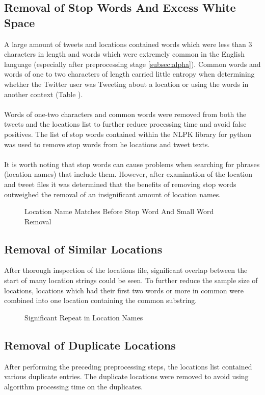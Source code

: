 \documentclass[11pt,a4paper]{article}
\begin{document}
\subsection{Removal of Stop Words And Excess White Space}
A large amount of tweets and locations contained words which were less than 3 characters in length and words which were extremely common in the English language (especially after preprocessing stage \ref{subsec:alpha}). Common words and words of one to two characters of length carried little entropy when determining whether the Twitter user was Tweeting about a location or using the words in another context (Table ).\\\\
Words of one-two characters and common words were removed from both the tweets and the locations list to further reduce processing time and avoid false positives. The list of stop words contained within the NLPK library for python was used to remove stop words from he locations and tweet texts.\\\\
It is worth noting that stop words can cause problems when searching for phrases (location names) that include them. However, after examination of the location and tweet files it was determined that the benefits of removing stop words outweighed the removal of an insignificant amount of location names. 

\begin{figure}[h]
	\centering
	\caption{Location Name Matches Before Stop Word And Small Word Removal}
\end{figure}

\subsection{Removal of Similar Locations}
After thorough inspection of the locations file, significant overlap between the start of many location strings could be seen. To further reduce the sample size of locations, locations which had their first two words or more in common were combined into one location containing the common substring.

\begin{figure}[h]
	\centering
	\caption{Significant Repeat in Location Names}
\end{figure}

\subsection{Removal of Duplicate Locations}       
After performing the preceding preprocessing steps, the locations list contained various duplicate entries. The duplicate locations were removed to avoid using algorithm processing time on the duplicates.
\end{document}
